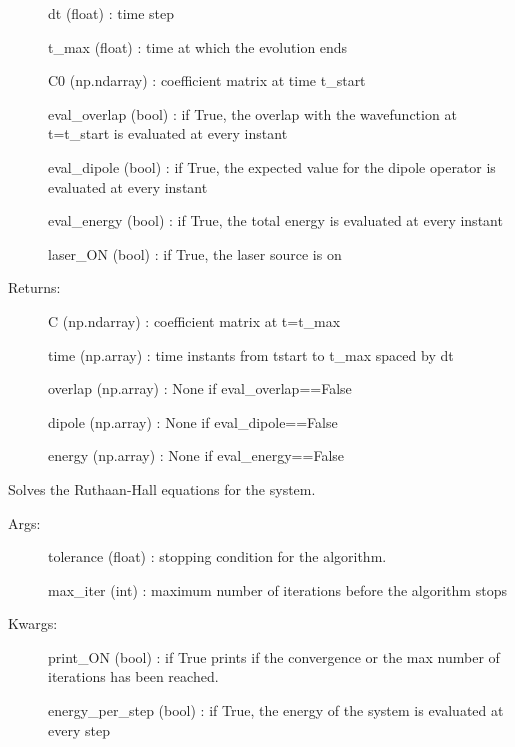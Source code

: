 \documentclass[letterpaper,10pt,english]{sphinxmanual}
\begin{document}
\begin{fulllineitems}
\begin{fulllineitems}
\begin{description}
dt (float) : time step

t\_max (float) : time at which the evolution ends

C0 (np.ndarray) : coefficient matrix at time t\_start

eval\_overlap (bool) : if True, the overlap with the wavefunction at t=t\_start is evaluated at every instant

eval\_dipole (bool) : if True, the expected value for the dipole operator is evaluated at every instant

eval\_energy (bool) : if True, the total energy is evaluated at every instant

laser\_ON (bool) : if True, the laser source is on

\item[{Returns: }] \leavevmode
C (np.ndarray) : coefficient matrix at t=t\_max

time (np.array) : time instants from tstart to t\_max spaced by dt

overlap (np.array) : None if eval\_overlap==False

dipole (np.array) : None if eval\_dipole==False

energy (np.array) : None if eval\_energy==False

\end{description}

\end{fulllineitems}


\begin{fulllineitems}
\label{\detokenize{index:do.GHF.solve_TIHF}}
Solves the Ruthaan-Hall equations for the system.
\begin{description}
\item[{Args:}] \leavevmode
tolerance (float) : stopping condition for the algorithm.

max\_iter (int) : maximum number of iterations before the algorithm stops

\item[{Kwargs:}] \leavevmode
print\_ON (bool) : if True prints if the convergence or the max number of iterations has been reached.

energy\_per\_step (bool) : if True, the energy of the system is evaluated at every step


\end{description}
\end{fulllineitems}
\end{fulllineitems}
\end{document}
